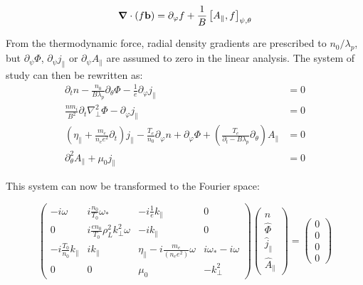 \begin{equation}
	\grad \cdot (f\mathbf{b}) = \partial_\varphi f + \frac{1}{B}\left[A_\parallel,f\right]_{\psi,\theta}
\end{equation}

From the thermodynamic force, radial density gradients are prescribed to $n_0 / \lambda_p$, but $\partial_\psi\Phi$, $\partial_\psi j_\parallel$ or $\partial_\psi A_\parallel$ are assumed to zero in the linear analysis. The system of study can then be rewritten as:
\begin{align}
	\partial_t n - \frac{n_0}{B\lambda_p}\partial_\theta\Phi - \frac{1}{e}\partial_\varphi j_\parallel &= 0 \\
	\frac{nm_i}{B^2}\partial_t\nabla_\perp^2\Phi - \partial_\varphi j_\parallel &= 0\\
	\left(\eta_\parallel + \frac{m_e}{n_ee^2}\partial_t \right) j_\parallel - \frac{T_e}{n_0}\partial_\varphi n + \partial_\varphi \Phi  + \left(\frac{T_e}{\partial_t - B\lambda_p}\partial_\theta\right) A_\parallel &= 0 \\
	\partial_\theta^2 A_\parallel + \mu_0 j_\parallel &= 0
\end{align}

This system can now be transformed to the Fourier space:

\begin{equation}
	\begin{pmatrix}
		-i\omega                  & i\frac{n_0}{T_0}\omega_*    & -i\frac{1}{e}k_\parallel & 0                  \\ 
		0                         & i\frac{en_0}{T_0}\rho_L^2k_\perp^2\omega        & -ik_\parallel            & 0                  \\ 
		-i\frac{T_0}{n_0}k_\parallel & ik_\parallel & \eta_\parallel - i\frac{m_e}{(n_ee^2)}\omega & i\omega_* - i\omega \\ 
		0                         & 0                             & \mu_0                   & -k_\perp^2
	\end{pmatrix}\begin{pmatrix}
		\hat{n} \\ \hat{\Phi} \\ \hat{j}_\parallel \\ \hat{A}_\parallel
	\end{pmatrix} = \begin{pmatrix}
		0 \\ 0 \\ 0 \\ 0
	\end{pmatrix}
\end{equation}

